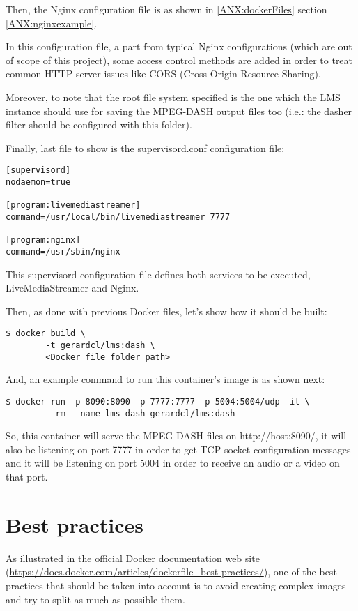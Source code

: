 Then, the Nginx configuration file is as shown in \ref{ANX:dockerFiles} section \ref{ANX:nginxexample}.

In this configuration file, a part from typical Nginx configurations (which are out of scope of this project), some access control methods are added in order to treat common HTTP server issues like CORS (Cross-Origin Resource Sharing).

Moreover, to note that the root file system specified is the one which the LMS instance should use for saving the MPEG-DASH output files too (i.e.: the dasher filter should be configured with this folder).

Finally, last file to show is the supervisord.conf configuration file:

\begin{verbatim}
[supervisord]
nodaemon=true

[program:livemediastreamer]
command=/usr/local/bin/livemediastreamer 7777

[program:nginx]
command=/usr/sbin/nginx 
\end{verbatim}

This supervisord configuration file defines both services to be executed, LiveMediaStreamer and Nginx.  

Then, as done with previous Docker files, let's show how it should be built:

\begin{verbatim}
$ docker build \
		-t gerardcl/lms:dash \
		<Docker file folder path>
\end{verbatim}

And, an example command to run this container's image is as shown next:

\begin{verbatim}
$ docker run -p 8090:8090 -p 7777:7777 -p 5004:5004/udp -it \
		--rm --name lms-dash gerardcl/lms:dash 
\end{verbatim}

So, this container will serve the MPEG-DASH files on http://host:8090/, it will also be listening on port 7777 in order to get TCP socket configuration messages and it will be listening on port 5004 in order to receive an audio or a video on that port.

\section{Best practices}

As illustrated in the official Docker documentation web site (\url{https://docs.docker.com/articles/dockerfile_best-practices/}), one of the best practices that should be taken into account is to avoid creating complex images and try to split as much as possible them.

